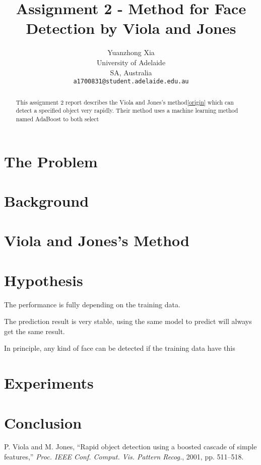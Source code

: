 \documentclass[10pt,twocolumn,letterpaper]{article}
\begin{document}
\title{Assignment 2 - Method for Face Detection by Viola and Jones}
\author{Yuanzhong Xia\\
University of Adelaide\\
SA, Australia\\
{\tt\small a1700831@student.adelaide.edu.au}
}
\maketitle

\begin{abstract}
This assignment 2 report describes the Viola and Jones's method{\ref{origin}} which can detect a specified object very rapidly.
Their method uses a machine learning method named AdaBoost to both select 


\end{abstract}


\section{The Problem}

\section{Background}

\section{Viola and Jones's Method}


\section{Hypothesis}

The performance is fully depending on the training data.

The prediction result is very stable, using the same model to predict will always get the same result.

In principle, any kind of face can be detected if the training data have this 

\section{Experiments}

\section{Conclusion}

\begin{thebibliography}{9}
P. Viola and M. Jones, ``Rapid object detection using a boosted cascade of simple features,''
\textit{Proc. IEEE Conf. Comput. Vis. Pattern Recog.}, 2001, pp. 511–518.


\end{thebibliography}
\end{document}
